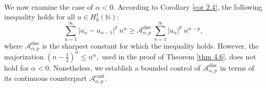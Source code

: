 \documentclass[11pt]{amsart}
\newcommand{\1}{[1]}
\begin{document}
\phantom{.} \\
We now examine the case of $\alpha < 0.$ According to Corollary \ref{cor 2.4}, the following inequality holds for all $u \in H_{0}^{1}(\mathbb{N}):$
\begin{equation}
\sum_{n=1}^{\infty} |u_{n}-u_{n-1}|^{p} \ n^{\alpha}  \geq  \mathcal{A}^{\text{disc}}_{\alpha,p} \, \sum_{n=1}^{\infty} |u_{n}|^{p} \ n^{\alpha-p}, \tag{4.7} \label{4.7}
\end{equation}
where $\mathcal{A}^{\text{disc}}_{\alpha,p} $ is the sharpest constant for which the inequality holds. However, the majorization $(n- \frac{1}{2})^{\alpha} \leq n^{\alpha},$ used in the proof of Theorem \ref{thm 4.6}, does not hold for $\alpha<0$. Nonetheless, we establish a bounded control of $\mathcal{A}_{\alpha,p}^{\text{disc}}$ in terms of its continuous counterpart $\mathcal{A}_{\alpha,p}^{\text{cont}}$.
\end{document}
